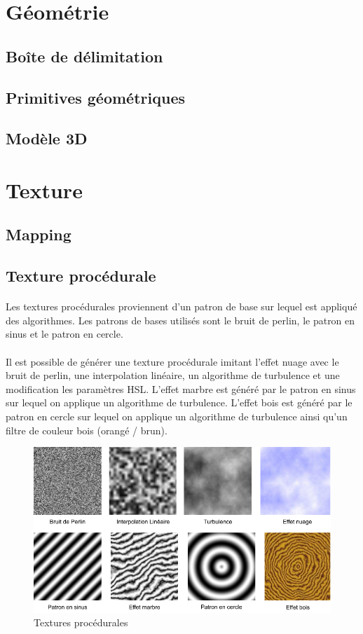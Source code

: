 \section{Géométrie}
\subsection{Boîte de délimitation}
\subsection{Primitives géométriques}
\subsection{Modèle 3D}

\section{Texture}
\subsection{Mapping}
\subsection{Texture procédurale}
\paragraph{} Les textures procédurales proviennent d'un patron de base sur lequel est appliqué des algorithmes. Les patrons de bases utilisés sont le bruit de perlin, le patron en sinus et le patron en cercle.
\paragraph{} Il est possible de générer une texture procédurale imitant l'effet nuage avec le bruit de perlin, une interpolation linéaire, un algorithme de turbulence et une modification les paramètres HSL. L'effet marbre est généré par le patron en sinus sur lequel on applique un algorithme de turbulence. L'effet bois est généré par le patron en cercle sur lequel on applique un algorithme de turbulence ainsi qu'un filtre de couleur bois (orangé / brun).
\begin{figure}[H]
\centering
\includegraphics[width=\textwidth]{img/infog-image-procedural-texture.png}
\caption{Textures procédurales}\label{fig-procedural-texture}
\end{figure}
